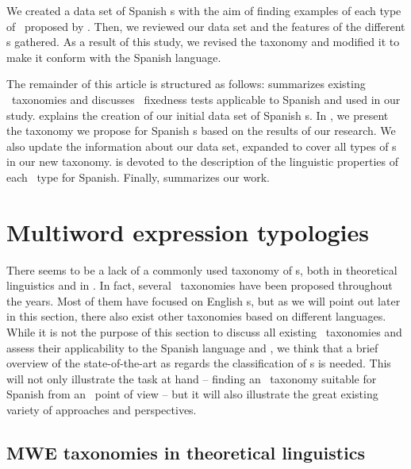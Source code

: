 \documentclass[output=paper]{langsci/langscibook}
\begin{document}
We created a data set of  Spanish \mwe s with the aim of finding examples of each type of \mwe\ proposed by \citet{Ramisch:2012,Ramisch:2015}. 
Then, we reviewed our data set and the features of the different \mwe s gathered.
As a result of this study, we revised the taxonomy and modified it to make it conform with the Spanish language.

\largerpage
The remainder of this article is structured as follows:  summarizes existing \mwe\ taxonomies and  discusses \mwe\ fixedness tests applicable to Spanish and used in our study. 
 explains the creation of our initial data set of Spanish \mwe s. 
In , we present the taxonomy we propose for Spanish \mwe s based on the results of our research. 
We also update the information about our data set, expanded to cover all types of \mwe s in our new taxonomy. 
 is devoted to the description of the linguistic properties of each \mwe\ type for Spanish.
Finally,  summarizes our work.

\section{Multiword expression typologies}
\label{sec:mwe_typologies}

There seems to be a lack of a commonly used taxonomy of \mwe s, both in theoretical linguistics and in \nlp.
In fact, several \mwe\ taxonomies have been proposed throughout the years. 
Most of them have focused on English \mwe s, but as we will point out later in this section, there also exist other taxonomies based on different languages.
While it is not the purpose of this section to discuss all existing \mwe\ taxonomies and assess their applicability to the Spanish language and \nlp , we think that a brief overview of the state-of-the-art as regards the classification of \mwe s is needed.
This will not only illustrate the task at hand -- finding an \mwe\ taxonomy suitable for Spanish from an \nlp\ point of view -- but it will also illustrate the great existing variety of approaches and perspectives.

\subsection{MWE taxonomies in theoretical linguistics}
\label{ssec:taxonomies_theoreticalLinguistics}
\end{document}
